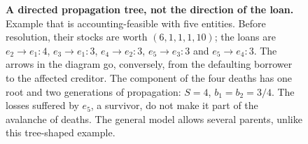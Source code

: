 \begin{figure}[htbp]\centering
{}
\caption{\textbf{A directed propagation tree, not the direction of the loan.}
Example that is accounting-feasible with five entities. Before resolution,
their stocks are worth $(6,1,1,1,10)$; the loans are
$e_2\to e_1:4$, $e_3\to e_1:3$, $e_4\to e_2:3$,
$e_5\to e_3:3$ and $e_5\to e_4:3$.
The arrows in the diagram go, conversely, from the defaulting borrower to
the affected creditor. The component of the four deaths has one root and
two generations of propagation: $S=4$, $b_1=b_2=3/4$.
The losses suffered by $e_5$, a survivor, do not make it part of
the avalanche of deaths. The general model allows several parents,
unlike this tree-shaped example.}
\label{fig:cascade}
\end{figure}
